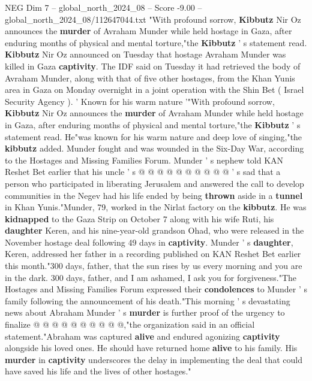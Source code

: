 \begin{textsample}{NEG Dim 7 – global\_north\_2024\_08 – Score -9.00 – global\_north\_2024\_08/112647044.txt}  \label{ex:f7_neg_082}
"With profound sorrow, \textbf{Kibbutz} Nir Oz announces the \textbf{murder} of Avraham Munder while held hostage in Gaza, after enduring months of physical and mental torture,"the \textbf{Kibbutz} ' s statement read. \textbf{Kibbutz} Nir Oz announced on Tuesday that hostage Avraham Munder was killed in Gaza \textbf{captivity}.
The IDF said on Tuesday it had retrieved the body of Avraham Munder, along with that of five other hostages, from the Khan Yunis area in Gaza on Monday overnight in a joint operation with the Shin Bet ( Israel Security Agency ). ' Known for his warm nature '"With profound sorrow, \textbf{Kibbutz} Nir Oz announces the \textbf{murder} of Avraham Munder while held hostage in Gaza, after enduring months of physical and mental torture,"the \textbf{Kibbutz} ' s statement read.
He"was known for his warm nature and deep love of singing,"the \textbf{kibbutz} added.
Munder fought and was wounded in the Six-Day War, according to the Hostages and Missing Families Forum.
Munder ' s nephew told KAN Reshet Bet earlier that his uncle ' s @ @ @ @ @ @ @ @ @ @ ' s sad that a person who participated in liberating Jerusalem and answered the call to develop communities in the Negev had his life ended by being \textbf{thrown} aside in a \textbf{tunnel} in Khan Yunis."Munder, 79, worked in the Nirlat factory on the \textbf{kibbutz}.
He was \textbf{kidnapped} to the Gaza Strip on October 7 along with his wife Ruti, his \textbf{daughter} Keren, and his nine-year-old grandson Ohad, who were released in the November hostage deal following 49 days in \textbf{captivity}.
Munder ' s \textbf{daughter}, Keren, addressed her father in a recording published on KAN Reshet Bet earlier this month."300 days, father, that the sun rises by us every morning and you are in the dark. 300 days, father, and I am ashamed, I ask you for forgiveness."The Hostages and Missing Families Forum expressed their \textbf{condolences} to Munder ' s family following the announcement of his death."This morning ' s devastating news about Abraham Munder ' s \textbf{murder} is further proof of the urgency to finalize @ @ @ @ @ @ @ @ @ @,"the organization said in an official statement."Abraham was captured \textbf{alive} and endured agonizing \textbf{captivity} alongside his loved ones.
He should have returned home \textbf{alive} to his family.
His \textbf{murder} in \textbf{captivity} underscores the delay in implementing the deal that could have saved his life and the lives of other hostages."

\end{textsample}
